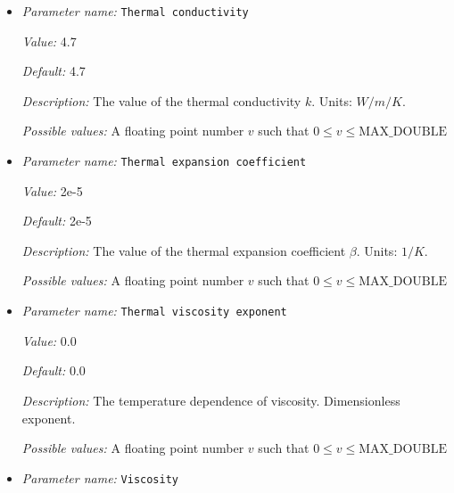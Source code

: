 \begin{itemize}
{\it Description:} The reference temperature $T_0$. Units: $K$.


{\it Possible values:} A floating point number $v$ such that $0 \leq v \leq \text{MAX\_DOUBLE}$
\item {\it Parameter name:} {\tt Thermal conductivity}
\label{parameters:Material model/Composition reaction model/Thermal conductivity}
\label{parameters:Material_20model/Composition_20reaction_20model/Thermal_20conductivity}


{\it Value:} 4.7


{\it Default:} 4.7


{\it Description:} The value of the thermal conductivity $k$. Units: $W/m/K$.


{\it Possible values:} A floating point number $v$ such that $0 \leq v \leq \text{MAX\_DOUBLE}$
\item {\it Parameter name:} {\tt Thermal expansion coefficient}
\label{parameters:Material model/Composition reaction model/Thermal expansion coefficient}
\label{parameters:Material_20model/Composition_20reaction_20model/Thermal_20expansion_20coefficient}


{\it Value:} 2e-5


{\it Default:} 2e-5


{\it Description:} The value of the thermal expansion coefficient $\beta$. Units: $1/K$.


{\it Possible values:} A floating point number $v$ such that $0 \leq v \leq \text{MAX\_DOUBLE}$
\item {\it Parameter name:} {\tt Thermal viscosity exponent}
\label{parameters:Material model/Composition reaction model/Thermal viscosity exponent}
\label{parameters:Material_20model/Composition_20reaction_20model/Thermal_20viscosity_20exponent}


{\it Value:} 0.0


{\it Default:} 0.0


{\it Description:} The temperature dependence of viscosity. Dimensionless exponent.


{\it Possible values:} A floating point number $v$ such that $0 \leq v \leq \text{MAX\_DOUBLE}$
\item {\it Parameter name:} {\tt Viscosity}
\label{parameters:Material model/Composition reaction model/Viscosity}
\label{parameters:Material_20model/Composition_20reaction_20model/Viscosity}



\end{itemize}
